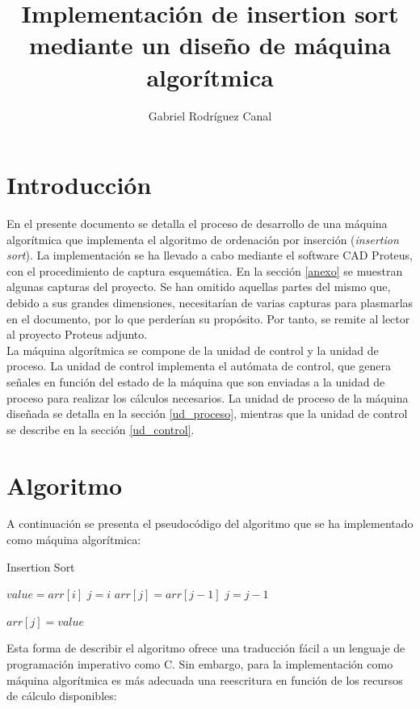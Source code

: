\documentclass[12pt,a4paper,oneside]{article}
\date{}
\author{Gabriel Rodríguez Canal}
\title{Implementación de insertion sort mediante un diseño de máquina algorítmica}
\begin{document}
\maketitle

\section{Introducción}

En el presente documento se detalla el proceso de desarrollo de una máquina algorítmica
que implementa el algoritmo de ordenación por inserción (\textit{insertion sort}). La
implementación se ha llevado a cabo mediante el software CAD Proteus, con el procedimiento
de captura esquemática. En la sección \ref{anexo} se muestran algunas capturas del proyecto.
Se han omitido aquellas partes del mismo que, debido a sus grandes dimensiones, necesitarían 
de varias capturas para plasmarlas en el documento, por lo que perderían su propósito. Por tanto, se 
remite al lector al proyecto Proteus adjunto.\\

La máquina algorítmica se compone de la unidad de control y la unidad de proceso. La unidad 
de control implementa el autómata de control, que genera señales en función del estado de la 
máquina que son enviadas a la unidad de proceso para realizar los cálculos necesarios. La unidad 
de proceso de la máquina diseñada se detalla en la sección \ref{ud_proceso}, mientras que la unidad 
de control se describe en la sección \ref{ud_control}.

\section{Algoritmo}
A continuación se presenta el pseudocódigo del algoritmo que se ha implementado como máquina
algorítmica:

\begin{algorithm}[H]
    \caption{Insertion Sort}\label{insertion_sort}
    \begin{algorithmic}[1]
        \State $value = arr[i]$
        \State $j = i$
            \State $arr[j] = arr[j-1]$
            \State $j = j-1$
        \EndWhile
        
        \State $arr[j] = value$
    \EndFor
    \end{algorithmic}
\end{algorithm}

Esta forma de describir el algoritmo ofrece una traducción fácil a un lenguaje de programación 
imperativo como C. Sin embargo, para la implementación como máquina algorítmica es más adecuada 
una reescritura en función de los recursos de cálculo disponibles: \\
\end{document}

